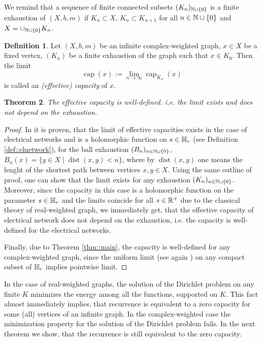 \documentclass[a4paper,11pt]{amsart}
\newtheorem{theorem}{Theorem}[section]
\theoremstyle{definition}
\newtheorem{definition}[theorem]{Definition}
\DeclareMathOperator\dist{dist}
\newcommand{\cp}{\operatorname{cap}}
\newcommand{\cfreq}{s}
\begin{document}
We remind that  a sequence of finite connected subsets $(K_n)_{\Bbb N\cup\{0\}}$ is a finite exhaustion of $(X,b,m)$ if $K_n\subset  X$, $K_n\subset K_{n+1}$ for all $n\in \Bbb N\cup\{0\}$ and $X=\cup_{\Bbb N\cup\{0\}} K_n$.


\begin{definition}
Let $(X,b,m)$ be an infinite  complex-weighted graph, $x\in X$ be a fixed vertex, $(K_n)$ be a finite exhaustion of the graph such that $x\in K_0$. Then the limit
$$
 \cp(x) :=\lim_{n\to\infty }\cp_{K_n}(x)
$$
is called an {\em (effective) capacity} of $x$.
\end{definition}

\begin{theorem}\label{thm::effCap}
The effective capacity is well-defined.
 i.e. the limit exists and does not depend on the exhaustion.
\end{theorem}

\begin{proof}
In \cite[Theorem 6(a)]{Muranova3} it is proven, that the limit of effective capacities exists in the case of electrical networks and is a holomorphic function on $\cfreq\in \Bbb H_r$  (see Definition \ref{def::elnetwork}),  for the ball exhaustion $(B_n)_{n\in \Bbb N\cup\{0\}}$, $B_n(x)=\{y\in X\mid\dist (x,y)< n\}$, where by $\dist(x,y)$ one means the lenght of the shortest path between vertices $x,y\in X$. Using the same outline of proof, one can show that the limit exists for any exhaustion $(K_n)_{n\in \Bbb N\cup\{0\}}$. Moreover, since the capacity in this case is a holomorphic function on the parameter $\cfreq\in \Bbb H_r$ and the limits coincide for all $\cfreq\in \Bbb R^+$ due to the classical theory of real-weighted graph, we immediately get, that the effective capacity of electrical network does not depend on the exhaustion, i.e. the capacity is well-defined for the electrical networks.

Finally, due to Theorem \ref{thm::main}, the capacity is well-defined for any complex-weighted graph, since the uniform limit (see again \cite[Theorem 6(a)]{Muranova3}) on any compact subset of $\Bbb H_r$ implies pointwise limit.
\end{proof}
In the case of real-weighted graphs, the solution of the Dirichlet problem on any finite $K$ minimizes the energy among all the functions, supported on $K$. This fact almost immediately implies, that recurrence  is equivalent to a zero capacity for some (all) vertices of  an infinite graph. In the complex-weighted case the minimization property for the solution of the Dirichlet problem fails. In the next theorem we show,  that the recurrence is still equivalent to the zero capacity.
\end{document}
